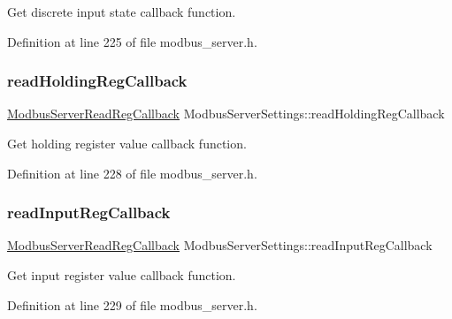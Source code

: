 Get discrete input state callback function. 



Definition at line 225 of file modbus\+\_\+server.\+h.

\mbox{\label{structModbusServerSettings_a859712883e372e00b39a4ac270a402bf}} 
\subsubsection{\texorpdfstring{read\+Holding\+Reg\+Callback}{readHoldingRegCallback}}
{\footnotesize\ttfamily \hyperlink{modbus__server_8h_a3d9a52f0b248469bb1e36927cdb5ce91}{Modbus\+Server\+Read\+Reg\+Callback} Modbus\+Server\+Settings\+::read\+Holding\+Reg\+Callback}



Get holding register value callback function. 



Definition at line 228 of file modbus\+\_\+server.\+h.

\mbox{\label{structModbusServerSettings_a1657429226ae26f0c0fe0c4f81d8c05f}} 
\subsubsection{\texorpdfstring{read\+Input\+Reg\+Callback}{readInputRegCallback}}
{\footnotesize\ttfamily \hyperlink{modbus__server_8h_a3d9a52f0b248469bb1e36927cdb5ce91}{Modbus\+Server\+Read\+Reg\+Callback} Modbus\+Server\+Settings\+::read\+Input\+Reg\+Callback}



Get input register value callback function. 



Definition at line 229 of file modbus\+\_\+server.\+h.

\mbox{\label{structModbusServerSettings_aaa25139042e2337576526848e05a4a5d}} 
